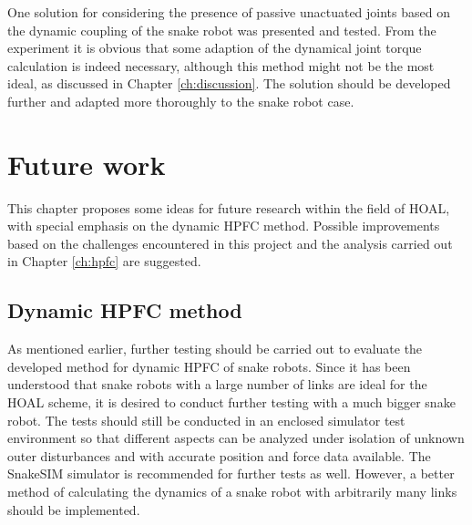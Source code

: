 One solution for considering the presence of passive unactuated joints based on the dynamic coupling of the snake robot was presented and tested. From the experiment it is obvious that some adaption of the dynamical joint torque calculation is indeed necessary, although this method might not be the most ideal, as discussed in Chapter \ref{ch:discussion}. The solution should be developed further and adapted more thoroughly to the snake robot case.




\chapter{Future work}\label{ch:future}

This chapter proposes some ideas for future research within the field of HOAL, with special emphasis on the dynamic HPFC method. Possible improvements based on the challenges encountered in this project and the analysis carried out in Chapter \ref{ch:hpfc} are suggested.

\section{Dynamic HPFC method}

As mentioned earlier, further testing should be carried out to evaluate the developed method for dynamic HPFC of snake robots. Since it has been understood that snake robots with a large number of links are ideal for the HOAL scheme, it is desired to conduct further testing with a much bigger snake robot. The tests should still be conducted in an enclosed simulator test environment so that different aspects can be analyzed under isolation of unknown outer disturbances and with accurate position and force data available. The SnakeSIM simulator is recommended for further tests as well. However, a better method of calculating the dynamics of a snake robot with arbitrarily many links should be implemented.

